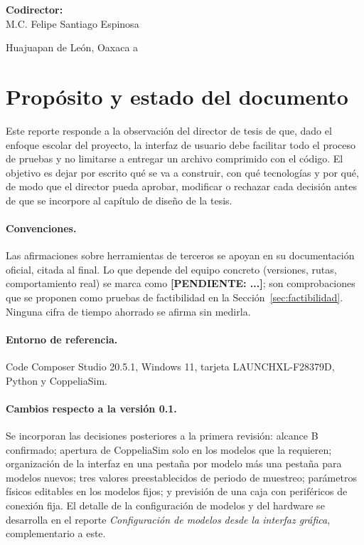 \documentclass[12pt,letterpaper]{article}
\newcommand{\pendiente}[1]{\textbf{[PENDIENTE: #1]}}
\begin{document}
\begin{center}
    {\textbf{Codirector:}\\\vspace{0.2cm}
   M.C. Felipe Santiago Espinosa\vspace{0.2cm}\\}
\end{center}

\begin{center}
    \vspace{0.4cm}
	{Huajuapan de León, Oaxaca a \text{\today}}
\end{center}
\clearpage


\tableofcontents\clearpage

\section{Propósito y estado del documento}

Este reporte responde a la observación del director de tesis de que, dado el enfoque escolar del proyecto, la interfaz de usuario debe facilitar todo el proceso de pruebas y no limitarse a entregar un archivo comprimido con el código. El objetivo es dejar por escrito qué se va a construir, con qué tecnologías y por qué, de modo que el director pueda aprobar, modificar o rechazar cada decisión antes de que se incorpore al capítulo de diseño de la tesis.

\paragraph{Convenciones.} Las afirmaciones sobre herramientas de terceros se apoyan en su documentación oficial, citada al final. Lo que depende del equipo concreto (versiones, rutas, comportamiento real) se marca como \pendiente{...}; son comprobaciones que se proponen como pruebas de factibilidad en la Sección~\ref{sec:factibilidad}. Ninguna cifra de tiempo ahorrado se afirma sin medirla.

\paragraph{Entorno de referencia.} Code Composer Studio 20.5.1, Windows 11, tarjeta LAUNCHXL-F28379D, Python y CoppeliaSim.

\paragraph{Cambios respecto a la versión 0.1.} Se incorporan las decisiones posteriores a la primera revisión: alcance B confirmado; apertura de CoppeliaSim solo en los modelos que la requieren; organización de la interfaz en una pestaña por modelo más una pestaña para modelos nuevos; tres valores preestablecidos de periodo de muestreo; parámetros físicos editables en los modelos fijos; y previsión de una caja con periféricos de conexión fija. El detalle de la configuración de modelos y del hardware se desarrolla en el reporte \textit{Configuración de modelos desde la interfaz gráfica}, complementario a este.
\end{document}
